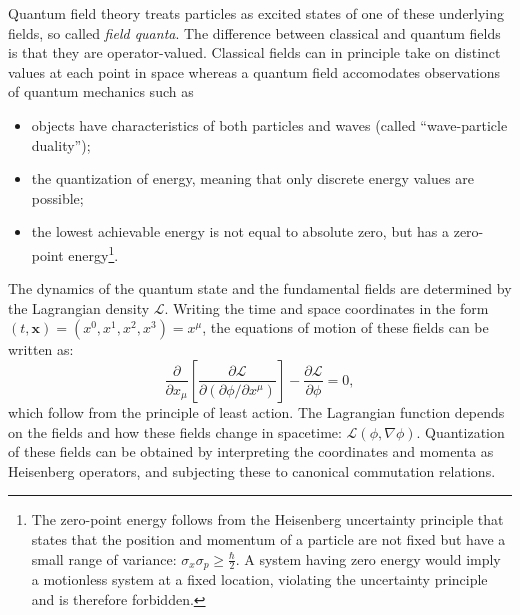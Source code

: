 \vspace{2mm}

\noindent Quantum field theory treats particles as excited states of one of these underlying fields, so called \textit{field quanta}. The difference between classical and quantum fields is that they are operator-valued. Classical fields can in principle take on distinct values at each point in space whereas a quantum field accomodates observations of quantum mechanics such as
\begin{itemize}
\item objects have characteristics of both particles and waves (called ``wave-particle duality'');
\item the quantization of energy, meaning that only discrete energy values are possible;
\item the lowest achievable energy is not equal to absolute zero, but has a zero-point energy\footnote{The zero-point energy follows from the Heisenberg uncertainty principle that states that the position and momentum of a particle are not fixed but have a small range of variance: $\sigma_x\sigma_p \geq \frac{\hbar }{2}$. A system having zero energy would imply a motionless system at a fixed location, violating the uncertainty principle and is therefore forbidden.}.
\end{itemize}

\vspace{2mm}

\noindent The dynamics of the quantum state and the fundamental fields are determined by the Lagrangian density $\mathcal{L}$. Writing the time and space coordinates in the form $(t,\mathbf{x}) = (x^0, x^1, x^2, x^3) = x^\mu$, the equations of motion of these fields can be written as:
\begin{equation}
\frac{\partial}{\partial x_{\mu}}\left[\frac{\partial \mathcal{L}}{\partial\left(\partial\phi/\partial x^{\mu}\right)}\right] - \frac{\partial \mathcal{L}}{\partial \phi} = 0,
\end{equation}
which follow from the principle of least action. The Lagrangian function depends on the fields and how these fields change in spacetime: $\mathcal{L(\phi,\nabla\phi)}$. Quantization of these fields can be obtained by interpreting the coordinates and momenta as Heisenberg operators, and subjecting these to canonical commutation relations. 

